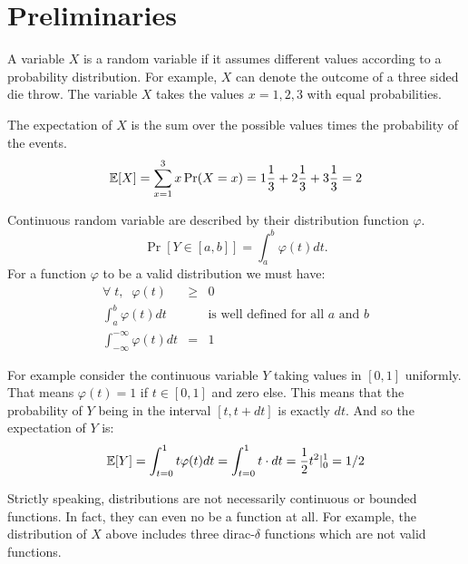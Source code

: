 \documentclass{article}
\begin{document}



\section{Preliminaries}
A variable $X$ is a random variable if it assumes different values
according to a probability distribution. For example, $X$ can 
denote the outcome of a three sided die throw. 
The variable $X$ takes the values $x = 1,2,3$ with equal probabilities. 

The expectation of $X$ is the sum over the possible values times the probability of the events.
\begin{equation}
{\mathbb E}[X] = \sum_{x=1}^{3}x \Pr(X = x)=
1\frac{1}{3}+2\frac{1}{3}+3\frac{1}{3} = 2
\end{equation}


Continuous random variable are described by their distribution function $\varphi$.
$$
\Pr[Y \in [a,b]] = \int_{a}^{b}\varphi (t) dt.
$$
For a function $\varphi$ to be a valid distribution we must have:
\begin{eqnarray}
\forall \;t, \;\; \varphi(t) &\ge& 0 \\
\int_{a}^{b}\varphi (t) dt && \mbox{is well defined for all $a$ and $b$}\\
\int_{-\infty}^{-\infty}\varphi (t) dt &=& 1
\end{eqnarray}

For example consider the continuous variable $Y$ taking values in
$[0,1]$ uniformly. That means $\varphi(t) = 1$ if $t \in [0,1]$ and zero else.
This means that the probability of $Y$ being in the interval $[t,t + dt]$ is exactly $dt$. And so the expectation of $Y$ is:
\begin{equation}
{\mathbb E}[Y] = \int_{t=0}^{1}t \varphi(t) dt = \int_{t=0}^{1}t \cdot dt = \frac{1}{2}t^2|_{0}^{1} = 1/2
\end{equation}

\begin{remark}
Strictly speaking, distributions are not necessarily continuous or bounded functions. 
In fact, they can even no be a function at all. 
For example, the distribution of $X$ above includes three dirac-$\delta$ functions which are not valid functions.
\end{remark}
\end{document}
